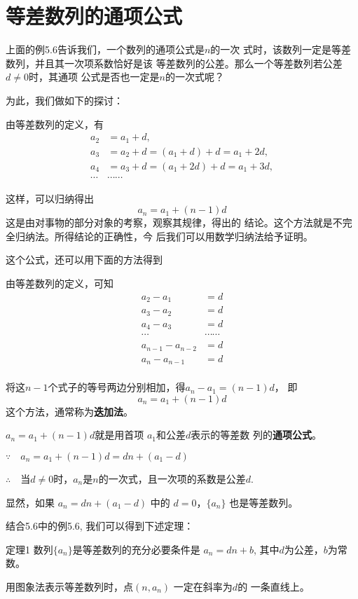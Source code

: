 \section{等差数列的通项公式}
上面的例5.6告诉我们，一个数列的通项公式是$n$的一次
式时，该数列一定是等差数列，并且其一次项系数恰好是该
等差数列的公差。那么一个等差数列若公差$d\ne 0$时，其通项
公式是否也一定是$n$的一次式呢？

为此，我们做如下的探讨：

由等差数列的定义，有
\[\begin{split}
  a_2&=a_1+d,\\
a_3&=a_2+d=(a_1+d)+d=a_1+2d,\\
a_4&=a_3+d=(a_1+2d)+d=a_1+3d,\\
\cdots &\cdots \cdots
\end{split}\]

这样，可以归纳得出
\[a_n=a_1+(n-1)d\]
这是由对事物的部分对象的考察，观察其规律，得出的
结论。这个方法就是不完全归纳法。所得结论的正确性，今
后我们可以用数学归纳法给予证明。

这个公式，还可以用下面的方法得到

由等差数列的定义，可知
\[\begin{split}
    a_2-a_1&=d\\
    a_3-a_2&=d\\
    a_4-a_3&=d\\
    \cdots&\cdots\cdots\\
    a_{n-1}-a_{n-2}&=d\\
    a_n-a_{n-1}&=d\\
\end{split}\]

将这$n-1$个式子的等号两边分别相加，得$a_n-a_1=(n-1)d$，
即
\[a_n=a_1+(n-1)d\]
这个方法，通常称为\textbf{迭加法}。

$a_n=a_1+(n-1)d$就是用首项
$a_1$和公差$d$表示的等差数
列的\textbf{通项公式}。

$\because\quad a_n=a_1+(n-1)d=dn+(a_1-d)$

$\therefore\quad$当$d\ne 0$时，$a_n$是$n$的一次式，且一次项的系数是公差$d$.

显然，如果
$a_n=dn+(a_1-d)$
中的
$d=0$，$\{a_n\}$
也是等差数列。

结合5.6中的例5.6, 我们可以得到下述定理：

\begin{thm}
{定理1} 数列$\{a_n\}$是等差数列的充分必要条件是
$a_n=dn+b$, 其中$d$为公差，$b$为常数。
\end{thm}

用图象法表示等差数列时，点$(n,a_n)$
一定在斜率为$d$的
一条直线上。

